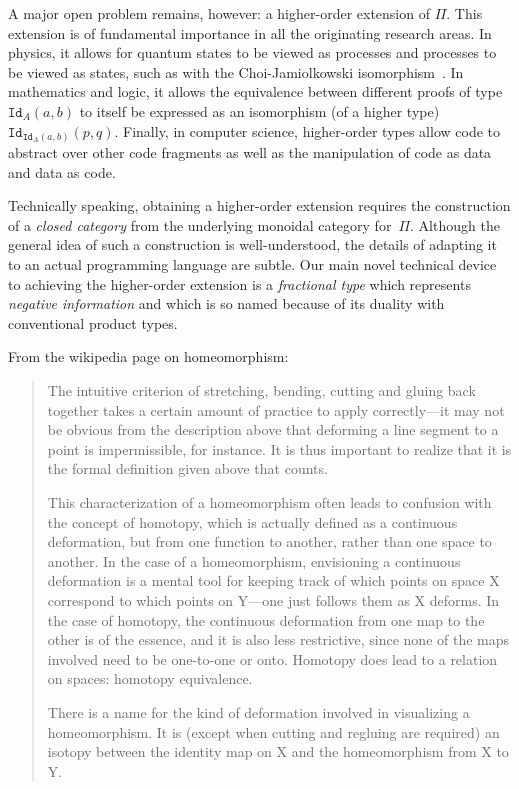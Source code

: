 \documentclass[11pt]{article}
\begin{document}
A major open problem remains, however: a higher-order extension of
$\Pi$. This extension is of fundamental importance in all the originating
research areas. In physics, it allows for quantum states to be viewed as
processes and processes to be viewed as states, such as with the
Choi-Jamiolkowski
isomorphism~\cite{choi1975completely,jamiolkowski1972linear}.  In mathematics
and logic, it allows the equivalence between different proofs of type
$\texttt{Id}_A(a,b)$ to itself be expressed as an isomorphism (of a higher
type) $\texttt{Id}_{\texttt{Id}_A(a,b)}(p,q)$. Finally, in computer science,
higher-order types allow code to abstract over other code fragments as well
as the manipulation of code as data and data as code.

Technically speaking, obtaining a higher-order extension requires the
construction of a \emph{closed category} from the underlying monoidal
category for~$\Pi$. Although the general idea of such a construction is
well-understood, the details of adapting it to an actual programming language
are subtle.  Our main novel technical device to achieving the higher-order
extension is a \emph{fractional type} which represents \emph{negative
information} and which is so named because of its duality with conventional
product types.

From the wikipedia page on homeomorphism: 
\begin{quote}
The intuitive criterion of stretching, bending, cutting and gluing back
together takes a certain amount of practice to apply correctly—it may not be
obvious from the description above that deforming a line segment to a point
is impermissible, for instance. It is thus important to realize that it is
the formal definition given above that counts.

This characterization of a homeomorphism often leads to confusion with the
concept of homotopy, which is actually defined as a continuous deformation,
but from one function to another, rather than one space to another. In the
case of a homeomorphism, envisioning a continuous deformation is a mental
tool for keeping track of which points on space X correspond to which points
on Y—one just follows them as X deforms. In the case of homotopy, the
continuous deformation from one map to the other is of the essence, and it is
also less restrictive, since none of the maps involved need to be one-to-one
or onto. Homotopy does lead to a relation on spaces: homotopy equivalence.

There is a name for the kind of deformation involved in visualizing a
homeomorphism. It is (except when cutting and regluing are required) an
isotopy between the identity map on X and the homeomorphism from X to Y.
\end{quote}
\end{document}
